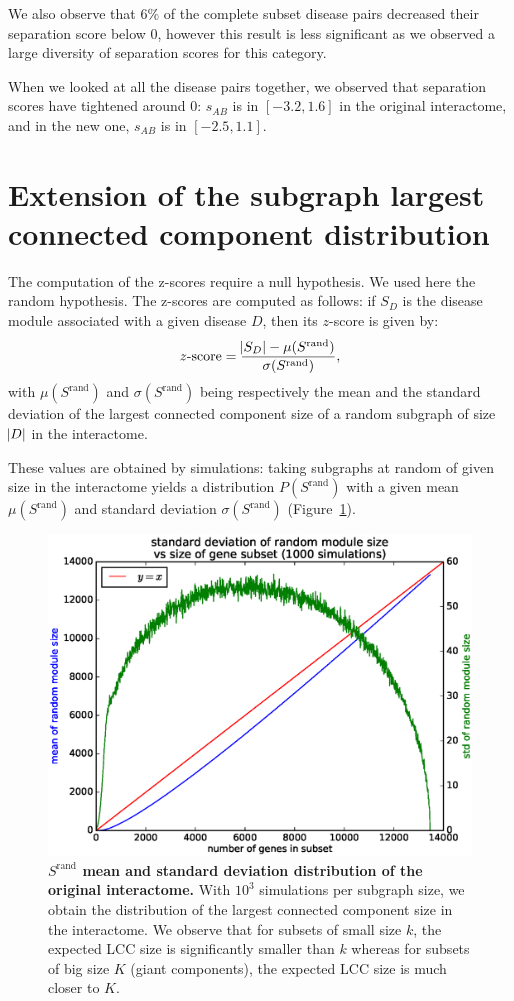 \documentclass[letterpaper]{article}
\begin{document}
	We also observe that $6\%$ of the complete subset disease pairs decreased their separation score below 0,
	however this result is less significant as we observed a large diversity of separation scores for this category.

	When we looked at all the disease pairs together, we observed that separation scores have tightened around 0:
	$s_{AB}$ is in $[-3.2, 1.6]$ in the original interactome, and in the new one, $s_{AB}$ is in $[-2.5, 1.1]$.


\section{Extension of the subgraph largest connected component distribution}
The computation of the z-scores require a null hypothesis. We used here the random hypothesis. The z-scores
are computed as follows: if $S_D$ is the disease module associated with a given disease $D$, then its
$z$-score is given by:
\begin{equation}
	z\text{-score} = \frac {\abs {S_D} - \mu(S^{\text{rand}})}{\sigma(S^{\text{rand}})},
\end{equation}
with $\mu(S^{\text{rand}})$ and $\sigma(S^{\text{rand}})$ being respectively the mean and the standard
deviation of the largest connected component size of a random subgraph of size $\abs D$ in the interactome.

These values are obtained by simulations: taking subgraphs at random of given size in the interactome yields a
distribution $P(S^{\text{rand}})$ with a given mean $\mu(S^{\text{rand}})$ and standard deviation
$\sigma(S^{\text{rand}})$ (Figure~\ref{fig:Srand distribution}).

\begin{figure}[!h]\centering
	\includegraphics[width=.45\textwidth]{images/Srand_distribution_1000_sims.eps}
	\caption{{\bf $S^{\text{rand}}$ mean and standard deviation distribution of the original interactome.}
	With $10^3$ simulations per subgraph size, we obtain the distribution of the largest connected component size
	in the interactome. We observe that for subsets of small size $k$, the expected LCC size is significantly smaller than $k$
	whereas for subsets of big size $K$ (giant components), the expected LCC size is much closer to $K$.
	\label{fig:Srand distribution}}
\end{figure}
\end{document}
